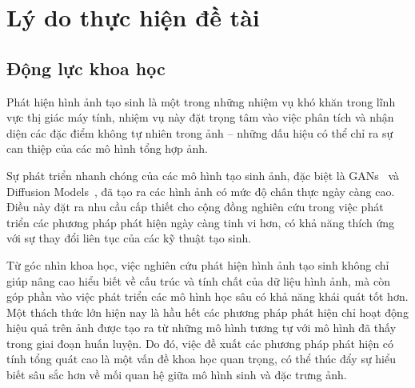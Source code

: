 \section{Lý do thực hiện đề tài}
%
\subsection{Động lực khoa học}
Phát hiện hình ảnh tạo sinh là một trong những nhiệm vụ khó khăn trong lĩnh vực thị giác máy tính, nhiệm vụ này đặt trọng tâm vào việc phân tích và nhận diện các đặc điểm không tự nhiên trong ảnh – những dấu hiệu có thể chỉ ra sự can thiệp của các mô hình tổng hợp ảnh. 
%
%

Sự phát triển nhanh chóng của các mô hình tạo sinh ảnh, đặc biệt là GANs~\cite{Goodfellow2014GenerativeAN} và Diffusion Models~\cite{Ho2020DenoisingDP}, đã tạo ra các hình ảnh có mức độ chân thực ngày càng cao. Điều này đặt ra nhu cầu cấp thiết cho cộng đồng nghiên cứu trong việc phát triển các phương pháp phát hiện ngày càng tinh vi hơn, có khả năng thích ứng với sự thay đổi liên tục của các kỹ thuật tạo sinh.
%

Từ góc nhìn khoa học, việc nghiên cứu phát hiện hình ảnh tạo sinh không chỉ giúp nâng cao hiểu biết về cấu trúc và tính chất của dữ liệu hình ảnh, mà còn góp phần vào việc phát triển các mô hình học sâu có khả năng khái quát tốt hơn. Một thách thức lớn hiện nay là hầu hết các phương pháp phát hiện chỉ hoạt động hiệu quả trên ảnh được tạo ra từ những mô hình tương tự với mô hình đã thấy trong giai đoạn huấn luyện. Do đó, việc đề xuất các phương pháp phát hiện có tính tổng quát cao là một vấn đề khoa học quan trọng, có thể thúc đẩy sự hiểu biết sâu sắc hơn về mối quan hệ giữa mô hình sinh và đặc trưng ảnh.
%

